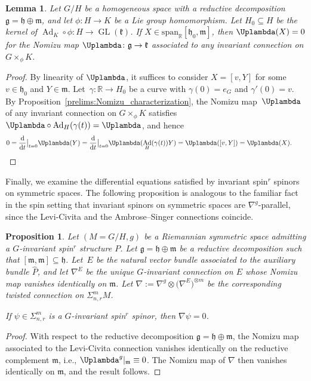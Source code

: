\documentclass[pdftex]{sigma}
\numberwithin{equation}{section}
\newtheorem{Lemma}[Theorem]{Lemma}
\newtheorem{Proposition}[Theorem]{Proposition}
{ \theoremstyle{definition}
	\newtheorem{Definition}[Theorem]{Definition}
	\newtheorem{Note}[Theorem]{Note}
	\newtheorem{Example}[Theorem]{Example}
	\newtheorem{Remark}[Theorem]{Remark} }
\newcommand{\R}{\mathbb{R}} %
\DeclareMathOperator{\GL}{GL}
\DeclareMathOperator{\Ad}{Ad}
\begin{document}
		\begin{Lemma}\label{prelims:Nomizu_criterion}
			Let $G/H$ be a homogeneous space with a reductive decomposition $\mathfrak{g} = \mathfrak{h} \oplus \mathfrak{m}$, and let $\phi \colon H \to K$ be a Lie group homomorphism. Let $H_0\subseteq H$ be the kernel of $\Ad_K \circ \phi\colon H \to \GL(\mathfrak{k})$. If $X \in \text{span}_{\R}[ \mathfrak{h}_0 , \mathfrak{m} ]$, then $\Uplambda(X)=0$ for the Nomizu map $\Uplambda\colon\mathfrak{g}\to\mathfrak{k}$ associated to any invariant connection on $G\times_{\phi} K$.
		\end{Lemma}
		\begin{proof}
			By linearity of $\Uplambda$, it suffices to consider $X=[v,Y]$ for some $v \in \mathfrak{h}_0$ and $Y \in \mathfrak{m}$. Let~${\gamma\colon \R \to H_0}$ be a curve with $\gamma(0)=e_{G}$ and $\gamma'(0) = v$. By Proposition~\ref{prelims:Nomizu_characterization}, the Nomizu map~$\Uplambda$ of any invariant connection on $G\times_{\phi} K$ satisfies $\Uplambda\circ \Ad_H(\gamma(t)) = \Uplambda$, and hence
			\[0= \frac{{\rm d}}{{\rm d}t}\big\rvert_{t=0} \Uplambda(Y) = \frac{\rm d}{{\rm d}t}\big\rvert_{t=0} \Uplambda(\Ad_H(\gamma(t)) Y) = \Uplambda([v,Y]) = \Uplambda(X).\tag*{\qed}
 \] \renewcommand{\qed}{}
		\end{proof}

Finally, we examine the differential equations satisfied by invariant spin$^r$ spinors on symmetric spaces. The following proposition is analogous to the familiar fact in the spin setting that invariant spinors on symmetric spaces are $\nabla^g$-parallel, since the Levi-Civita and the Ambrose--Singer connections coincide.

		\begin{Proposition}\label{symmetricspace_differential_equation}
			Let $(M=G/H,g)$ be a Riemannian symmetric space admitting a $G$-invariant spin$^r$ structure $P$. Let $\mathfrak{g} = \mathfrak{h} \oplus \mathfrak{m}$ be a reductive decomposition such that ${[\mathfrak{m},\mathfrak{m}] \subseteq \mathfrak{h}}$. Let~$E$ be the natural vector bundle associated to the auxiliary bundle $\hat{P}$, and let $\nabla^E$ be the unique $G$-invariant connection on $E$ whose Nomizu map vanishes identically on $\mathfrak{m}$. Let $\nabla:= \nabla^g \otimes \bigl(\nabla^E\bigr)^{\otimes m}$ be the corresponding twisted connection on $\Sigma_{n,r}^m M$.
			
			If $\psi \in \Sigma_{n,r}^m$ is a $G$-invariant spin$^r$ spinor, then $\nabla \psi =0$.
		\end{Proposition}
		\begin{proof}
			With respect to the reductive decomposition $\mathfrak{g} = \mathfrak{h} \oplus \mathfrak{m}$, the Nomizu map associated to the Levi-Civita connection vanishes identically on the reductive complement $\mathfrak{m}$, i.e., $\Uplambda^g\rvert_{\mathfrak{m}} \equiv 0$. The Nomizu map of $\nabla$ then vanishes identically on $\mathfrak{m}$, and the result follows.
		\end{proof}
		
\end{document}
